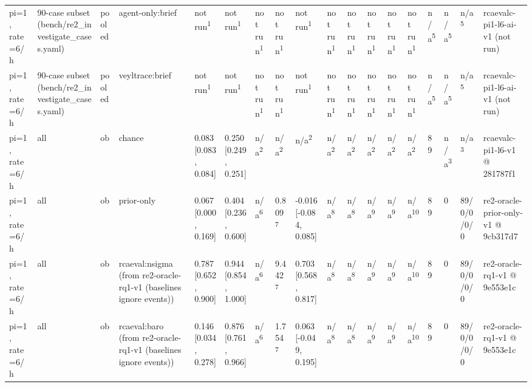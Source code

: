 \begin{table}[t]
\begin{tabular}{llllllllllllllllll}
pi=1, rate=6/h & 90-case subset (bench/re2\_investigate\_cases.yaml) & pooled & agent-only:brief & not run\textsuperscript{1} & not run\textsuperscript{1} & not run\textsuperscript{1} & not run\textsuperscript{1} & not run\textsuperscript{1} & not run\textsuperscript{1} & not run\textsuperscript{1} & not run\textsuperscript{1} & not run\textsuperscript{1} & not run\textsuperscript{1} & n/a\textsuperscript{5} & n/a\textsuperscript{5} & n/a\textsuperscript{5} & rcaevalc-pi1-l6-ai-v1 (not run) \\
pi=1, rate=6/h & 90-case subset (bench/re2\_investigate\_cases.yaml) & pooled & veyltrace:brief & not run\textsuperscript{1} & not run\textsuperscript{1} & not run\textsuperscript{1} & not run\textsuperscript{1} & not run\textsuperscript{1} & not run\textsuperscript{1} & not run\textsuperscript{1} & not run\textsuperscript{1} & not run\textsuperscript{1} & not run\textsuperscript{1} & n/a\textsuperscript{5} & n/a\textsuperscript{5} & n/a\textsuperscript{5} & rcaevalc-pi1-l6-ai-v1 (not run) \\
pi=1, rate=6/h & all & ob & chance & 0.083 [0.083, 0.084] & 0.250 [0.249, 0.251] & n/a\textsuperscript{2} & n/a\textsuperscript{2} & n/a\textsuperscript{2} & n/a\textsuperscript{2} & n/a\textsuperscript{2} & n/a\textsuperscript{2} & n/a\textsuperscript{2} & n/a\textsuperscript{2} & 89 & n/a\textsuperscript{3} & n/a\textsuperscript{3} & rcaevalc-pi1-l6-v1 @ 281787f1 \\
pi=1, rate=6/h & all & ob & prior-only & 0.067 [0.000, 0.169] & 0.404 [0.236, 0.600] & n/a\textsuperscript{6} & 0.809\textsuperscript{7} & -0.016 [-0.084, 0.085] & n/a\textsuperscript{8} & n/a\textsuperscript{8} & n/a\textsuperscript{9} & n/a\textsuperscript{9} & n/a\textsuperscript{10} & 89 & 0 & 89/0/0/0/0 & re2-oracle-prior-only-v1 @ 9cb317d7 \\
pi=1, rate=6/h & all & ob & rcaeval:nsigma (from re2-oracle-rq1-v1 (baselines ignore events)) & 0.787 [0.652, 0.900] & 0.944 [0.854, 1.000] & n/a\textsuperscript{6} & 9.442\textsuperscript{7} & 0.703 [0.568, 0.817] & n/a\textsuperscript{8} & n/a\textsuperscript{8} & n/a\textsuperscript{9} & n/a\textsuperscript{9} & n/a\textsuperscript{10} & 89 & 0 & 89/0/0/0/0 & re2-oracle-rq1-v1 @ 9e553e1c \\
pi=1, rate=6/h & all & ob & rcaeval:baro (from re2-oracle-rq1-v1 (baselines ignore events)) & 0.146 [0.034, 0.278] & 0.876 [0.761, 0.966] & n/a\textsuperscript{6} & 1.754\textsuperscript{7} & 0.063 [-0.049, 0.195] & n/a\textsuperscript{8} & n/a\textsuperscript{8} & n/a\textsuperscript{9} & n/a\textsuperscript{9} & n/a\textsuperscript{10} & 89 & 0 & 89/0/0/0/0 & re2-oracle-rq1-v1 @ 9e553e1c \\

\end{tabular}
\end{table}
